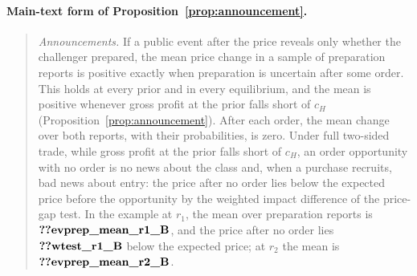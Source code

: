 \paragraph{Main-text form of Proposition~\ref{prop:announcement}.}
\begin{quote}
\emph{Announcements.} If a public event after the price reveals only whether the challenger prepared, the mean price
change in a sample of preparation reports is positive exactly when preparation is uncertain after some order. This
holds at every prior and in every equilibrium, and the mean is positive whenever gross profit at the prior falls short
of \(c_H\) (Proposition~\ref{prop:announcement}). After each order, the mean change over both reports, with their
probabilities, is zero. Under full two-sided trade, while gross profit at the prior falls short of \(c_H\), an order
opportunity with no order is no news about the class and, when a purchase recruits, bad news about entry: the price
after no order lies below the expected price before the opportunity by the weighted impact difference of the
price-gap test. In the example at \(r_1\), the mean over preparation reports is
\(\reg{evprep_mean_r1_B}\), and the price after no order lies \(\reg{wtest_r1_B}\) below the expected price; at
\(r_2\) the mean is \(\reg{evprep_mean_r2_B}\).
\end{quote}


